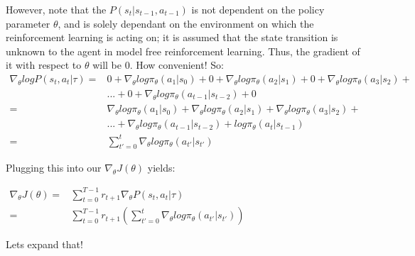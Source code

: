 \documentclass[letterpaper,11pt]{article}
\begin{document}
However, note that the $P(s_{t} | s_{t-1}, a_{t-1})$ is not dependent on the policy parameter $\theta$, and is solely dependant on the environment on which the reinforcement learning is acting on; it is assumed that the state transition is unknown to the agent in model free reinforcement learning. Thus, the gradient of it with respect to $\theta$ will be 0. How convenient! So: 
$$
\begin{aligned}
    \nabla_{\theta} log P(s_{t}, a_{t} | \tau) ={}& 0 + \nabla_{\theta} log \pi_{\theta}(a_{1} | s_{0}) + 0 + \nabla_{\theta} log \pi_{\theta}(a_{2} | s_{1}) + 0 + \nabla_{\theta} log \pi_{\theta}(a_{3} | s_{2}) + \\ & {} ... {} + {} 0 + \nabla_{\theta} log \pi_{\theta}(a_{t-1} | s_{t-2}) + 0 \\ ={}& \nabla_{\theta} log \pi_{\theta}(a_{1} | s_{0}) + \nabla_{\theta} log \pi_{\theta}(a_{2} | s_{1}) + \nabla_{\theta} log \pi_{\theta}(a_{3} | s_{2}) + \\
& ... + \nabla_{\theta} log \pi_{\theta}(a_{t-1} | s_{t-2}) + log \pi_{\theta}(a_{t} | s_{t-1})  \\ ={}& \sum\limits_{t'=0}^{t} \nabla_{\theta} log \pi_{\theta}(a_{t'} | s_{t'})                                                
\end{aligned}
$$

Plugging this into our $\nabla_{\theta} J(\theta)$ yields:

$\begin{aligned}
    \nabla_{\theta} J(\theta) ={}& \sum_{t=0}^{T-1} r_{t+1} \nabla_{\theta} P(s_{t}, a_{t} | \tau) \\
                              ={}& \sum_{t=0}^{T-1} r_{t+1} (\sum_{t'=0}^{t} \nabla_{\theta} log \pi_{\theta}(a_{t'} | s_{t'}))
\end{aligned}$

\vspace{1.0cm}
Lets expand that! 
\end{document}
